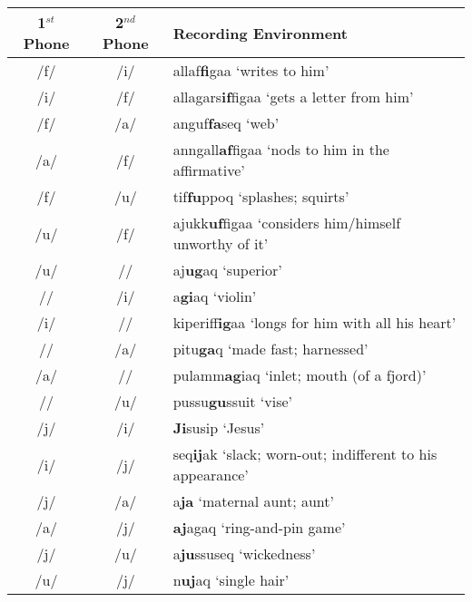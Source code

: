 \documentclass[12pt]{article}
\begin{document}
	\begin{centering}
	\begin{tabular}{|c|c|l|}
	\hline
	1$^{st}$ Phone & 2$^{nd}$ Phone & Recording Environment \\
	\hline
	/f/ & /i/ & allaf\textbf{fi}gaa `writes to him' \\
	/i/ & /f/ & allagars\textbf{if}figaa `gets a letter from him'\\
	/f/ & /a/ & anguf\textbf{fa}seq `web' \\
	/a/ & /f/ & anngall\textbf{af}figaa `nods to him in the affirmative' \\
	/f/ & /u/ & tif\textbf{fu}ppoq `splashes; squirts'\\
	/u/ & /f/ & ajukk\textbf{uf}figaa `considers him/himself unworthy of it'\\
	/u/ & /\textipa{G}/ & aj\textbf{ug}aq `superior' \\
	/\textipa{G}/ & /i/ & a\textbf{gi}aq `violin'\\
	/i/ & /\textipa{G}/ & kiperiff\textbf{ig}aa `longs for him with all his heart'\\
	/\textipa{G}/ & /a/ & pitu\textbf{ga}q `made fast; harnessed'\\
	/a/ & /\textipa{G}/ & pulamm\textbf{ag}iaq `inlet; mouth (of a fjord)'\\
	/\textipa{G}/ & /u/ & pussu\textbf{gu}ssuit `vise'\\
	/j/ & /i/ & \textbf{Ji}susip `Jesus'\\
	/i/ & /j/ & seq\textbf{ij}ak `slack; worn-out; indifferent to his appearance' \\
	/j/ & /a/ & a\textbf{ja} `maternal aunt; aunt' \\
	/a/ & /j/ & \textbf{aj}agaq `ring-and-pin game'\\
	/j/ & /u/ & a\textbf{ju}ssuseq `wickedness' \\
	/u/ & /j/ & n\textbf{uj}aq `single hair' \\
	\hline
	\end{tabular}
	\end{centering}
	\newpage
\end{document}
